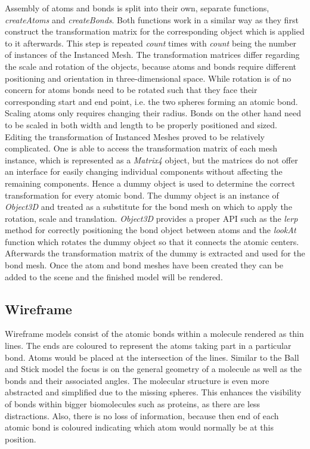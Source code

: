 Assembly of atoms and bonds is split into their own, separate functions, \textit{createAtoms} and \textit{createBonds}. Both functions work in a similar way as they first construct the transformation matrix for the corresponding object which is applied to it afterwards. This step is repeated \textit{count} times with \textit{count} being the number of instances of the Instanced Mesh. The transformation matrices differ regarding the scale and rotation of the objects, because atoms and bonds require different positioning and orientation in three-dimensional space. While rotation is of no concern for atoms bonds need to be rotated such that they face their corresponding start and end point, i.e. the two spheres forming an atomic bond. Scaling atoms only requires changing their radius. Bonds on the other hand need to be scaled in both width and length to be properly positioned and sized. Editing the transformation of Instanced Meshes proved to be relatively complicated. One is able to access the transformation matrix of each mesh instance, which is represented as a \textit{Matrix4} object, but the matrices do not offer an interface for easily changing individual components without affecting the remaining components. Hence a dummy object is used to determine the correct transformation for every atomic bond. The dummy object is an instance of \textit{Object3D} and treated as a substitute for the bond mesh on which to apply the rotation, scale and translation. \textit{Object3D} provides a proper API such as the \textit{lerp} method for correctly positioning the bond object between atoms and the \textit{lookAt} function which rotates the dummy object so that it connects the atomic centers. Afterwards the transformation matrix of the dummy is extracted and used for the bond mesh. Once the atom and bond meshes have been created they can be added to the scene and the finished model will be rendered.

\subsection{Wireframe}
\label{sec:implementation:molmodels:wire}

Wireframe models consist of the atomic bonds within a molecule rendered as thin lines. The ends are coloured to represent the atoms taking part in a particular bond. Atoms would be placed at the intersection of the lines. Similar to the Ball and Stick model the focus is on the general geometry of a molecule as well as the bonds and their associated angles. The molecular structure is even more abstracted and simplified due to the missing spheres. This enhances the visibility of bonds within bigger biomolecules such as proteins, as there are less distractions. Also, there is no loss of information, because then end of each atomic bond is coloured indicating which atom would normally be at this position.

